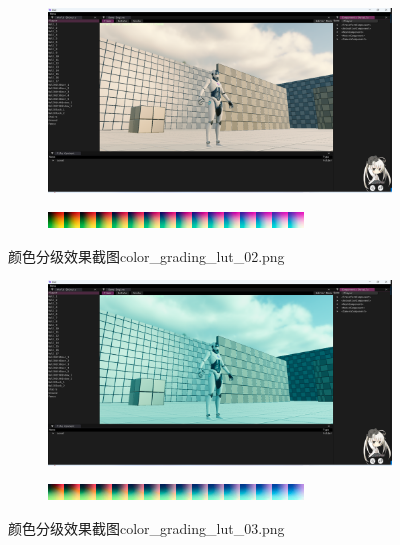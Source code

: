 \documentclass{ctexart}
\begin{document}
    \begin{figure}[!htb]
        \centering
        \begin{subfigure}{1.0\textwidth}
            \includegraphics[width=\textwidth]{screen_shot_color_grading_map_color_grading_lut_02.png}
        \end{subfigure}
        \begin{subfigure}{1.0\textwidth}
            \includegraphics[width=\textwidth]{color_grading_lut_02.png}
        \end{subfigure}      
        \caption{颜色分级效果截图color\_grading\_lut\_02.png}
    \end{figure}  
    \begin{figure}[!htb]
        \centering
        \begin{subfigure}{1.0\textwidth}
            \includegraphics[width=\textwidth]{screen_shot_color_grading_map_color_grading_lut_03.png}
        \end{subfigure}
        \begin{subfigure}{1.0\textwidth}
            \includegraphics[width=\textwidth]{color_grading_lut_03.png}
        \end{subfigure}      
        \caption{颜色分级效果截图color\_grading\_lut\_03.png}
    \end{figure}    
\end{document}
